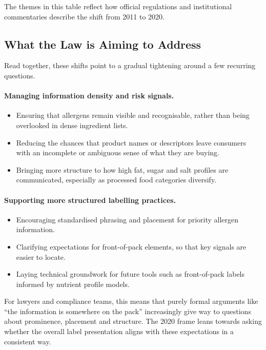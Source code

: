 \documentclass[12pt,a4paper]{article}
\begin{document}
The themes in this table reflect how official regulations and institutional commentaries describe the shift from 2011 to 2020.

\subsection{What the Law is Aiming to Address}

Read together, these shifts point to a gradual tightening around a few recurring questions.

\paragraph{Managing information density and risk signals.}

\begin{itemize}
  \item Ensuring that allergens remain visible and recognisable, rather than being overlooked in dense ingredient lists.
  \item Reducing the chances that product names or descriptors leave consumers with an incomplete or ambiguous sense of what they are buying.
  \item Bringing more structure to how high fat, sugar and salt profiles are communicated, especially as processed food categories diversify.
\end{itemize}

\paragraph{Supporting more structured labelling practices.}

\begin{itemize}
  \item Encouraging standardised phrasing and placement for priority allergen information.
  \item Clarifying expectations for front-of-pack elements, so that key signals are easier to locate.
  \item Laying technical groundwork for future tools such as front-of-pack labels informed by nutrient profile models.
\end{itemize}

For lawyers and compliance teams, this means that purely formal arguments like ``the information is somewhere on the pack'' increasingly give way to questions about prominence, placement and structure.
The 2020 frame leans towards asking whether the overall label presentation aligns with these expectations in a consistent way.
\end{document}
